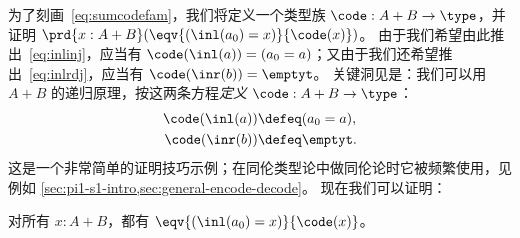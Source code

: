 为了刻画~\eqref{eq:sumcodefam}，我们将定义一个类型族 $\code:A+B\to\type$，并证明 $\prd{x:A+B} (\eqv{(\inl(a_0)=x)}{\code(x)})$。
由于我们希望由此推出~\eqref{eq:inlinj}，应当有 $\code(\inl(a)) = (a_0=a)$；又由于我们还希望推出~\eqref{eq:inlrdj}，应当有 $\code (\inr(b)) = \emptyt$。
关键洞见是：我们可以用 $A+B$ 的递归原理，按这两条方程\emph{定义} $\code:A+B\to\type$：
\begin{align*}
  \code(\inl(a)) &\defeq (a_0=a),\\
  \code(\inr(b)) &\defeq \emptyt.
\end{align*}
这是一个非常简单的证明技巧示例；在同伦类型论中做同伦论时它被频繁使用，见
例如 \cref{sec:pi1-s1-intro,sec:general-encode-decode}。
%
现在我们可以证明：

\begin{thm}\label{thm:path-coprod}
  对所有 $x:A+B$，都有 $\eqv{(\inl(a_0)=x)}{\code(x)}$。
\end{thm}
